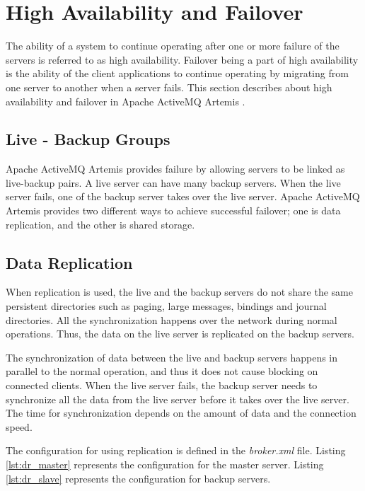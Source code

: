 \section{High Availability and Failover}

The ability of a system to continue operating after one or more failure of the servers is referred to as high availability. Failover being a part of high availability is the ability of the client applications to continue operating by migrating from one server to another when a server fails. This section describes about high availability and failover in Apache ActiveMQ Artemis \parencite{artemis_failover}.

\subsection{Live - Backup Groups}
Apache ActiveMQ Artemis provides failure by allowing servers to be linked as live-backup pairs. A live server can have many backup servers. When the live server fails, one of the backup server takes over the live server. Apache ActiveMQ Artemis provides two different ways to achieve successful failover; one is data replication, and the other is shared storage.

\subsection{Data Replication}

When replication is used, the live and the backup servers do not share the same persistent directories such as paging, large messages, bindings and journal directories. All the synchronization happens over the network during normal operations. Thus, the data on the live server is replicated on the backup servers. 

The synchronization of data between the live and backup servers happens in parallel to the normal operation, and thus it does not cause blocking on connected clients. When the live server fails, the backup server needs to synchronize all the data from the live server before it takes over the live server. The time for synchronization depends on the amount of data and the connection speed. 

The configuration for using replication is defined in the \textit{broker.xml} file. Listing \ref{lst:dr_master} represents the configuration for the master server. Listing \ref{lst:dr_slave} represents the configuration for backup servers.

